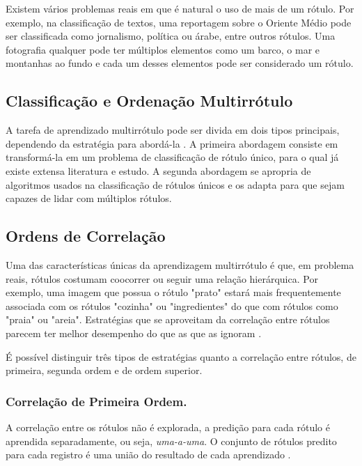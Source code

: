 \documentclass[runningheads,a4paper]{llncs}
\begin{document}
Existem vários problemas reais em que é natural o uso de mais de um rótulo. Por exemplo, na classificação de textos, uma reportagem sobre o Oriente Médio pode ser classificada como jornalismo, política ou árabe, entre outros rótulos. Uma fotografia qualquer pode ter múltiplos elementos como um barco, o mar e montanhas ao fundo e cada um desses elementos pode ser considerado um rótulo.

\subsection{Classificação e Ordenação Multirrótulo}\label{subsec:classord}

A tarefa de aprendizado multirrótulo pode ser divida em dois tipos principais, dependendo da estratégia para abordá-la \cite{Tsoumakas2009-vw}. A primeira abordagem consiste em transformá-la em um problema de classificação de rótulo único, para o qual já existe extensa literatura e estudo. A segunda abordagem se apropria de algoritmos usados na classificação de rótulos únicos e os adapta para que sejam capazes de lidar com múltiplos rótulos.

\subsection{Ordens de Correlação}\label{subsec:ordcorr}

Uma das características únicas da aprendizagem multirrótulo é que, em problema reais, rótulos costumam coocorrer ou seguir uma relação hierárquica. Por exemplo, uma imagem que possua o rótulo "prato" estará mais frequentemente associada com os rótulos "cozinha" ou "ingredientes" do que com rótulos como "praia" ou "areia". Estratégias que se aproveitam da correlação entre rótulos parecem ter melhor desempenho do que as que as ignoram \cite{Zhang2010-ee}.
 
É possível distinguir três tipos de estratégias quanto a correlação entre rótulos, de primeira, segunda ordem e de ordem superior.

\subsubsection{Correlação de Primeira Ordem.} \label{subsec:corr1ordem}

A correlação entre os rótulos não é explorada, a predição para cada rótulo é aprendida separadamente, ou seja, \emph{uma-a-uma}. O conjunto de rótulos predito para cada registro é uma união do resultado de cada aprendizado \cite{De_Carvalho2009-yp}.
\end{document}
